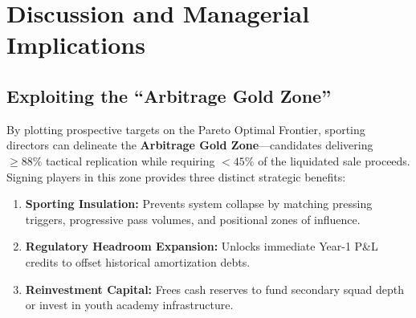 \documentclass[10pt,journal,compsoc]{IEEEtran}
\begin{document}
\section{Discussion and Managerial Implications}
\label{sec:discussion}

\subsection{Exploiting the ``Arbitrage Gold Zone''}
By plotting prospective targets on the Pareto Optimal Frontier, sporting directors can delineate the \textbf{Arbitrage Gold Zone}---candidates delivering $\ge 88\%$ tactical replication while requiring $< 45\%$ of the liquidated sale proceeds. Signing players in this zone provides three distinct strategic benefits:
\begin{enumerate}
    \item \textbf{Sporting Insulation:} Prevents system collapse by matching pressing triggers, progressive pass volumes, and positional zones of influence.
    \item \textbf{Regulatory Headroom Expansion:} Unlocks immediate Year-1 P\&L credits to offset historical amortization debts.
    \item \textbf{Reinvestment Capital:} Frees cash reserves to fund secondary squad depth or invest in youth academy infrastructure.
\end{enumerate}
\end{document}
